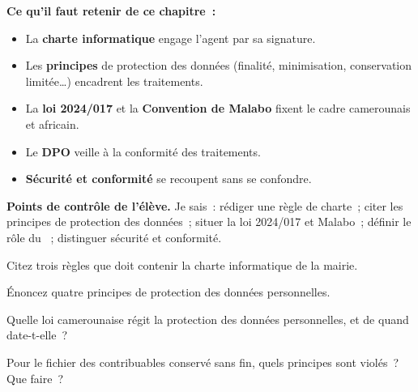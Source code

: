 \separateur

\begin{boxresume}
\textbf{Ce qu'il faut retenir de ce chapitre~:}
\begin{itemize}
    \item La \textbf{charte informatique} engage l'agent par sa signature.
    \item Les \textbf{principes} de protection des données (finalité,
          minimisation, conservation limitée\ldots) encadrent les traitements.
    \item La \textbf{loi 2024/017} et la \textbf{Convention de Malabo} fixent
          le cadre camerounais et africain.
    \item Le \textbf{DPO} veille à la conformité des traitements.
    \item \textbf{Sécurité et conformité} se recoupent sans se confondre.
\end{itemize}
\end{boxresume}

\begin{boxinfo}
\textbf{Points de contrôle de l'élève.} Je sais~: rédiger une règle de charte~;
citer les principes de protection des données~; situer la loi 2024/017 et
Malabo~; définir le rôle du ~; distinguer sécurité et conformité.
\end{boxinfo}

\bigskip

\begin{boxexo}[title={\ding{45}\quad Exercice~6.1. La charte \niveaubase}]
Citez trois règles que doit contenir la charte informatique de la mairie.
\end{boxexo}

\begin{boxexo}[title={\ding{45}\quad Exercice~6.2. Les principes \niveaubase}]
Énoncez quatre principes de protection des données personnelles.
\end{boxexo}

\begin{boxexo}[title={\ding{45}\quad Exercice~6.3. La loi \niveaubase}]
Quelle loi camerounaise régit la protection des données personnelles, et de
quand date-t-elle~?
\end{boxexo}

\begin{boxexo}[title={\ding{45}\quad Exercice~6.4. Deux principes en défaut \niveaumoyen}]
Pour le fichier des contribuables conservé sans fin, quels principes sont
violés~? Que faire~?
\end{boxexo}

